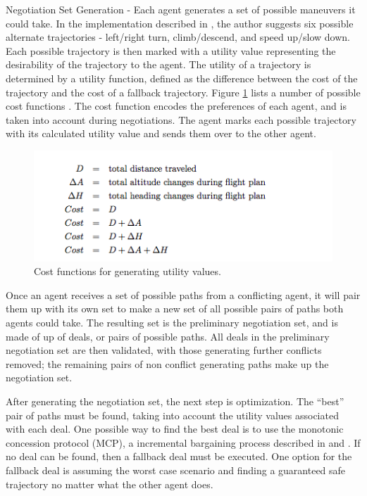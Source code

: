 \documentclass[conference]{IEEEtran}
\begin{document}
Negotiation Set Generation -
Each agent generates a set of possible maneuvers it could take. In the implementation described in \cite{vsivslak2008agentfly}, the author suggests six possible alternate trajectories - left/right turn, climb/descend, and speed up/slow down. Each possible trajectory is then marked with a utility value representing the desirability of the trajectory to the agent. The utility of a trajectory is determined by a utility function, defined as the difference between the cost of the trajectory and the cost of a fallback trajectory. Figure \ref{fig:05Wollkind} lists a number of possible cost functions \cite{wollkind2004automated}. The cost function encodes the preferences of each agent, and is taken into account during negotiations. The agent marks each possible trajectory with its calculated utility value and sends them over to the other agent.  

\begin{figure}[h]
	\includegraphics [width=1\columnwidth] {05WollkindCost}
	\caption{Cost functions for generating utility values. \cite{wollkind2004automated}}
	\label{fig:05Wollkind}
\end{figure}


Once an agent receives a set of possible paths from a conflicting agent, it will pair them up with its own set to make a new set of all possible pairs of paths both agents could take.  The resulting set is the preliminary negotiation set, and is made of up of deals, or pairs of possible paths. All deals in the preliminary negotiation set are then validated, with those generating further conflicts removed; the remaining pairs of non conflict generating paths make up the negotiation set. 

After generating the negotiation set, the next step is optimization. The “best” pair of paths must be found, taking into account the utility values associated with each deal. One possible way to find the best deal is to use the monotonic concession protocol (MCP), a incremental bargaining process described in  \cite{wollkind2004automated}  and \cite{zlotkin1989negotiation}. If no deal can be found, then a fallback deal must be executed. One option for the fallback deal is assuming the worst case scenario and finding a guaranteed safe trajectory no matter what the other agent does. 
\end{document}
